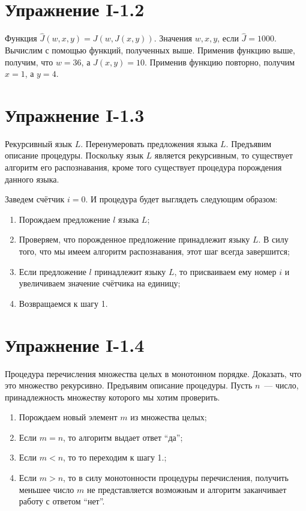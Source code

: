 \documentclass[12pt, oneside]{memoir}
\begin{document}
\section*{Упражнение I-1.2}
\begin{solution}
    {Функция $\hat{J} (w, x, y) = J(w, J(x, y))$.}
    {Значения $w, x, y$, если $\hat{J} = 1000$.}
    {Вычислим с помощью функций, полученных выше.}
    Применив функцию выше, получим, что $w = 36$, а $J(x, y) = 10$.
    Применив функцию повторно, получим $x = 1$, а $y = 4$.
\end{solution}

\section*{Упражнение I-1.3}
\begin{solution}
    {Рекурсивный язык $L$.}
    {Перенумеровать предложения языка $L$.}
    {Предъявим описание процедуры.}
    Поскольку язык $L$ является рекурсивным, то существует алгоритм его распознавания, кроме того существует процедура порождения данного языка.

    Заведем счётчик $i = 0$.
    И процедура будет выглядеть следующим образом:
    \begin{enumerate}
        \item Порождаем предложение $l$ языка $L$;
        \item Проверяем, что порожденное предложение принадлежит языку $L$.
              В силу того, что мы имеем алгоритм распознавания, этот шаг всегда завершится;
        \item Если предложение $l$ принадлежит языку $L$, то присваиваем ему номер $i$ и увеличиваем значение счётчика на единицу;
        \item Возвращаемся к шагу 1.
    \end{enumerate}
\end{solution}

\section*{Упражнение I-1.4}
\begin{solution}
    {Процедура перечисления множества целых в монотонном порядке.}
    {Доказать, что это множество рекурсивно.}
    {Предъявим описание процедуры.}
    Пусть $n$~--- число, принадлежность множеству которого мы хотим проверить.
    \begin{enumerate}
        \item Порождаем новый элемент $m$ из множества целых;
        \item Если $m = n$, то алгоритм выдает ответ \enquote{да};
        \item Если $m < n$, то то переходим к шагу 1.;
        \item Если $m > n$, то в силу монотонности процедуры перечисления, получить меньшее число $m$ не представляется возможным и алгоритм заканчивает работу с ответом \enquote{нет}.
    \end{enumerate}
\end{solution}
\end{document}
